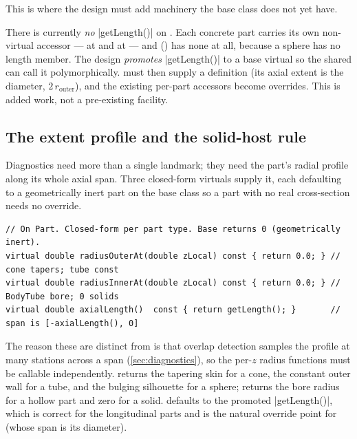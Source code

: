 This is where the design must add machinery the base class does not yet have.

\begin{designrule}
There is currently \emph{no} \cppinline|getLength()| on . Each concrete part carries its
own non-virtual accessor ---  at  and
 at  --- and 
() has none at all, because a sphere has no length member. The
design \emph{promotes} \cppinline|getLength()| to a base virtual so the shared  can
call it polymorphically.  must then supply a definition (its axial extent is the
diameter, $2\,r_\text{outer}$), and the existing per-part accessors become overrides. This is added
work, not a pre-existing facility.
\end{designrule}

\subsection{The extent profile and the solid-host rule}\label{sec:datamodel-profile}

Diagnostics need more than a single landmark; they need the part's radial profile along its whole
axial span. Three closed-form virtuals supply it, each defaulting to a geometrically inert part on
the base class so a part with no real cross-section needs no override.

\begin{listing}[htbp]
\begin{verbatim}
// On Part. Closed-form per part type. Base returns 0 (geometrically inert).
virtual double radiusOuterAt(double zLocal) const { return 0.0; } // cone tapers; tube const
virtual double radiusInnerAt(double zLocal) const { return 0.0; } // BodyTube bore; 0 solids
virtual double axialLength()  const { return getLength(); }       // span is [-axialLength(), 0]
\end{verbatim}
\caption{The extent-profile virtuals: outer radius, inner radius, and axial span, in the
\zfwd{} local frame.}\label{lst:profile}
\end{listing}

The reason these are distinct from  is that overlap detection samples the profile at
many stations across a span (\cref{sec:diagnostics}), so the per-$z$ radius functions must be
callable independently.  returns the tapering skin for a cone, the constant
outer wall for a tube, and the bulging silhouette for a sphere;  returns the
bore radius for a hollow part and zero for a solid.  defaults to the promoted
\cppinline|getLength()|, which is correct for the longitudinal parts and is the natural override
point for  (whose span is its diameter).

